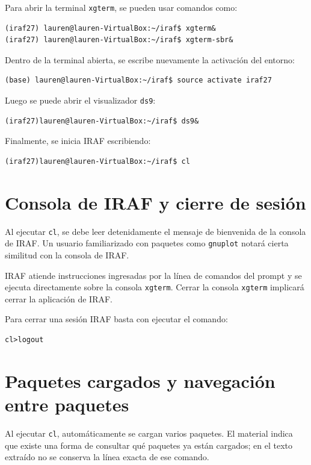 Para abrir la terminal \texttt{xgterm}, se pueden usar comandos como:

\begin{verbatim}
(iraf27) lauren@lauren-VirtualBox:~/iraf$ xgterm&
(iraf27) lauren@lauren-VirtualBox:~/iraf$ xgterm-sbr&
\end{verbatim}

Dentro de la terminal abierta, se escribe nuevamente la activación del entorno:

\begin{verbatim}
(base) lauren@lauren-VirtualBox:~/iraf$ source activate iraf27
\end{verbatim}

Luego se puede abrir el visualizador \texttt{ds9}:

\begin{verbatim}
(iraf27)lauren@lauren-VirtualBox:~/iraf$ ds9&
\end{verbatim}

Finalmente, se inicia IRAF escribiendo:

\begin{verbatim}
(iraf27)lauren@lauren-VirtualBox:~/iraf$ cl
\end{verbatim}

\section{Consola de IRAF y cierre de sesión}

Al ejecutar \texttt{cl}, se debe leer detenidamente el mensaje de bienvenida de la consola de IRAF. Un usuario familiarizado con paquetes como \texttt{gnuplot} notará cierta similitud con la consola de IRAF.

IRAF atiende instrucciones ingresadas por la línea de comandos del prompt y se ejecuta directamente sobre la consola \texttt{xgterm}. Cerrar la consola \texttt{xgterm} implicará cerrar la aplicación de IRAF.

Para cerrar una sesión IRAF basta con ejecutar el comando:

\begin{verbatim}
cl>logout
\end{verbatim}

\section{Paquetes cargados y navegación entre paquetes}

Al ejecutar \texttt{cl}, automáticamente se cargan varios paquetes. El material indica que existe una forma de consultar qué paquetes ya están cargados; en el texto extraído no se conserva la línea exacta de ese comando.

